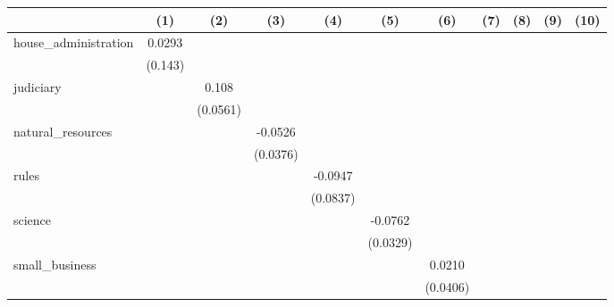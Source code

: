 \begin{tabular}{l*{10}{c}}
\toprule
                    &\multicolumn{1}{c}{(1)}&\multicolumn{1}{c}{(2)}&\multicolumn{1}{c}{(3)}&\multicolumn{1}{c}{(4)}&\multicolumn{1}{c}{(5)}&\multicolumn{1}{c}{(6)}&\multicolumn{1}{c}{(7)}&\multicolumn{1}{c}{(8)}&\multicolumn{1}{c}{(9)}&\multicolumn{1}{c}{(10)}\\
\midrule
house\_administration&      0.0293&            &            &            &            &            &            &            &            &            \\
                    &     (0.143)&            &            &            &            &            &            &            &            &            \\
judiciary           &            &       0.108&            &            &            &            &            &            &            &            \\
                    &            &    (0.0561)&            &            &            &            &            &            &            &            \\
natural\_resources   &            &            &     -0.0526&            &            &            &            &            &            &            \\
                    &            &            &    (0.0376)&            &            &            &            &            &            &            \\
rules               &            &            &            &     -0.0947&            &            &            &            &            &            \\
                    &            &            &            &    (0.0837)&            &            &            &            &            &            \\
science             &            &            &            &            &     -0.0762&            &            &            &            &            \\
                    &            &            &            &            &    (0.0329)&            &            &            &            &            \\
small\_business      &            &            &            &            &            &      0.0210&            &            &            &            \\
                    &            &            &            &            &            &    (0.0406)&            &            &            &            \\

\end{tabular}

